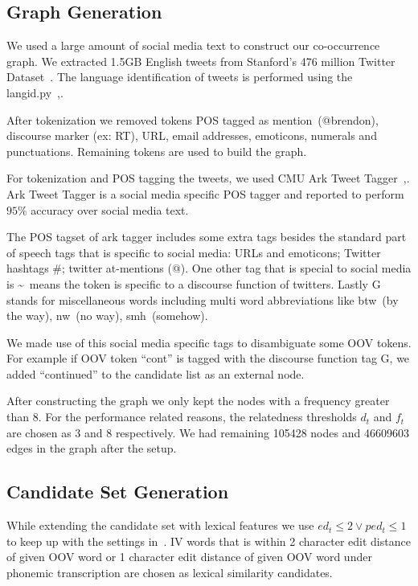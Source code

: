 \documentclass[preprint,review,12pt]{elsarticle}
\begin{document}
\subsection{Graph Generation}
We used a large amount of social media text to construct our co-occurrence graph. We extracted 1.5GB English tweets from Stanford's 476 million Twitter Dataset~\cite{DBLP:conf/wsdm/YangL11}. The language identification of tweets is performed using the langid.py~\cite{Lui:2012:LOL:2390470.2390475},\cite{Baldwin:2010:LIL:1857999.1858026}.

After tokenization we removed tokens POS tagged as mention~(@brendon), discourse marker (ex: RT), URL, email addresses, emoticons, numerals and punctuations. Remaining tokens are used to build the graph.

For tokenization and POS tagging the tweets, we used CMU Ark Tweet Tagger~\cite{DBLP:conf/naacl/OwoputiODGSS13},\cite{Gimpel:2011:PTT:2002736.2002747}. Ark Tweet Tagger is a social media specific POS tagger and reported to perform $95\%$ accuracy over social media text.

The POS tagset of ark tagger includes some extra tags besides the standard part of speech tags that is specific to social media: URLs and emoticons; Twitter hashtags \#; twitter at-mentions (@). One other tag that is special to social media is \textasciitilde~means the token is specific to a discourse function of twitters. Lastly G stands for miscellaneous words including multi word abbreviations like btw~(by the way), nw~(no way), smh~(somehow).

We made use of this social media specific tags to disambiguate some OOV tokens. For example if OOV token ``cont'' is tagged with the discourse function tag G, we added ``continued'' to the candidate list as an external node.

After constructing the graph we only kept the nodes with a frequency greater than 8. For the performance related reasons, the relatedness thresholds $d_t$ and $f_t$  are chosen as 3 and 8 respectively. We had remaining 105428 nodes and 46609603 edges in the graph after the setup.

\subsection{Candidate Set Generation}

While extending the candidate set with lexical features we use ${ed_t \leq 2} \vee {ped_t \leq 1}$ to keep up with the settings in~\cite{Han:2011:LNS:2002472.2002520}. IV words that is within 2 character edit distance of given OOV word or 1 character edit distance of given OOV word under phonemic transcription are chosen as lexical similarity candidates.
\end{document}
